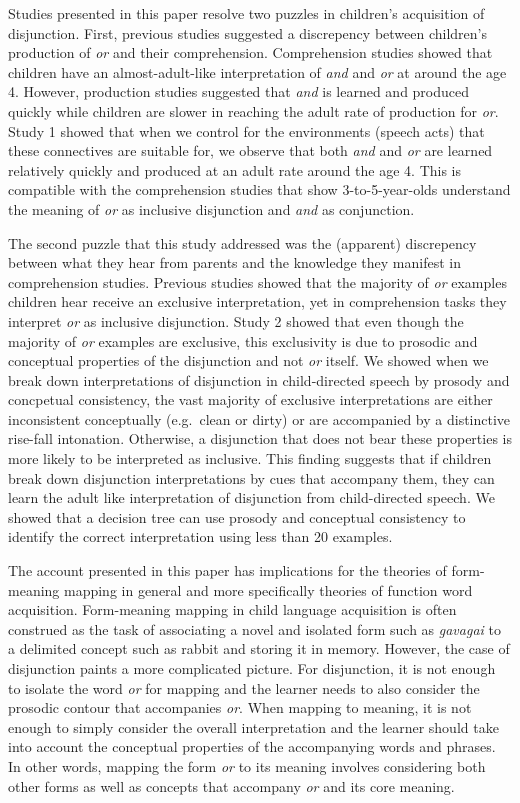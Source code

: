 \documentclass[10pt, letterpaper]{article}
\begin{document}
Studies presented in this paper resolve two puzzles in children's
acquisition of disjunction. First, previous studies suggested a
discrepency between children's production of \emph{or} and their
comprehension. Comprehension studies showed that children have an
almost-adult-like interpretation of \emph{and} and \emph{or} at around
the age 4. However, production studies suggested that \emph{and} is
learned and produced quickly while children are slower in reaching the
adult rate of production for \emph{or}. Study 1 showed that when we
control for the environments (speech acts) that these connectives are
suitable for, we observe that both \emph{and} and \emph{or} are learned
relatively quickly and produced at an adult rate around the age 4. This
is compatible with the comprehension studies that show 3-to-5-year-olds
understand the meaning of \emph{or} as inclusive disjunction and
\emph{and} as conjunction.

The second puzzle that this study addressed was the (apparent)
discrepency between what they hear from parents and the knowledge they
manifest in comprehension studies. Previous studies showed that the
majority of \emph{or} examples children hear receive an exclusive
interpretation, yet in comprehension tasks they interpret \emph{or} as
inclusive disjunction. Study 2 showed that even though the majority of
\emph{or} examples are exclusive, this exclusivity is due to prosodic
and conceptual properties of the disjunction and not \emph{or} itself.
We showed when we break down interpretations of disjunction in
child-directed speech by prosody and concpetual consistency, the vast
majority of exclusive interpretations are either inconsistent
conceptually (e.g.~clean or dirty) or are accompanied by a distinctive
rise-fall intonation. Otherwise, a disjunction that does not bear these
properties is more likely to be interpreted as inclusive. This finding
suggests that if children break down disjunction interpretations by cues
that accompany them, they can learn the adult like interpretation of
disjunction from child-directed speech. We showed that a decision tree
can use prosody and conceptual consistency to identify the correct
interpretation using less than 20 examples.

The account presented in this paper has implications for the theories of
form-meaning mapping in general and more specifically theories of
function word acquisition. Form-meaning mapping in child language
acquisition is often construed as the task of associating a novel and
isolated form such as \emph{gavagai} to a delimited concept such as
rabbit and storing it in memory. However, the case of disjunction paints
a more complicated picture. For disjunction, it is not enough to isolate
the word \emph{or} for mapping and the learner needs to also consider
the prosodic contour that accompanies \emph{or}. When mapping to
meaning, it is not enough to simply consider the overall interpretation
and the learner should take into account the conceptual properties of
the accompanying words and phrases. In other words, mapping the form
\emph{or} to its meaning involves considering both other forms as well
as concepts that accompany \emph{or} and its core meaning.
\end{document}
